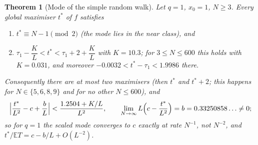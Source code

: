 \documentclass[11pt,a4paper]{article}
\newtheorem{theorem}{Theorem}[section]
\theoremstyle{definition}
\theoremstyle{remark}
\newcommand{\E}{\mathbb{E}}
\begin{document}
\begin{theorem}[Mode of the simple random walk]\label{thm:q1}
Let $q=1$, $x_0=1$, $N\ge3$. Every global maximiser $t^*$ of $f$ satisfies
\begin{enumerate}
\item $t^*\equiv N-1\pmod 2$ (the mode lies in the near class), and
\item $\tau_1-\dfrac{K}{L}<t^*<\tau_1+2+\dfrac KL$ with $K=10.3$; for $3\le N\le600$ this holds with $K=0.031$, and
 moreover $-0.0032<t^*-\tau_1<1.9986$ there.
\end{enumerate}
Consequently there are at most two maximisers (then $t^*$ and $t^*+2$; this happens for $N\in\{5,6,8,9\}$ and for
no other $N\le600$), and
\begin{equation}\label{eq:q1rate}
  \Bigl|\frac{t^*}{L^2}-c+\frac bL\Bigr|<\frac{1.2504+K/L}{L^2},\qquad
  \lim_{N\to\infty}L\Bigl(c-\frac{t^*}{L^2}\Bigr)=b=0.33250858\ldots\ne0 ;
\end{equation}
so for $q=1$ the scaled mode converges to $c$ exactly at rate $N^{-1}$, not $N^{-2}$, and
$t^*/\E T=c-b/L+O(L^{-2})$.
\end{theorem}
\end{document}
